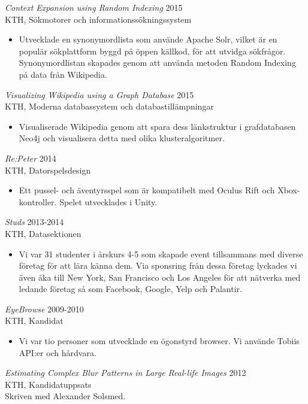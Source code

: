 \documentclass[margin, 10pt]{res} %
\begin{document}
\begin{resume}
{\sl Context Expansion using Random Indexing} \hfill 2015 \\
KTH, Sökmotorer och informationssökningssystem
\begin{itemize} 
\item Utvecklade en synonymordlista som använde Apache Solr, vilket är en populär sökplattform byggd på öppen källkod, för att utvidga sökfrågor. Synonymordlistan skapades genom att använda metoden Random Indexing på data från Wikipedia.
\end{itemize} 

\begin{minipage}{\textwidth}
{\sl Visualizing Wikipedia using a Graph Database} \hfill 2015 \\
KTH, Moderna databassystem och databastillämpningar
\begin{itemize} 
\item Visualiserade Wikipedia genom att spara dess länkstruktur i grafdatabasen Neo4j och visualisera detta med olika klusteralgoritmer.
\end{itemize} 
\end{minipage}

{\sl Re:Peter} \hfill 2014 \\
KTH, Datorspelsdesign
\begin{itemize} 
\item Ett pussel- och äventyrsspel som är kompatibelt med Oculus Rift och Xbox-kontroller. Spelet utvecklades i Unity.
\end{itemize} 

{\sl Studs} \hfill 2013-2014 \\
KTH, Datasektionen
\begin{itemize} 
\item Vi var 31 studenter i årskurs 4-5 som skapade event tillsammans med diverse företag för att lära känna dem. Via sponsring från dessa företag lyckades vi även åka till New York, San Francisco och Los Angeles för att nätverka med ledande företag så som Facebook, Google, Yelp och Palantir.
\end{itemize} 

{\sl EyeBrowse} \hfill 2009-2010 \\
KTH, Kandidat
\begin{itemize} 
\item Vi var tio personer som utvecklade en ögonstyrd browser. Vi använde Tobiis API:er och hårdvara.
\end{itemize} 

{\sl Estimating Complex Blur Patterns in Large Real-life Images} \hfill 2012 \\
KTH, Kandidatuppsats \\
Skriven med Alexander Solsmed.



\end{resume}
\end{document}
